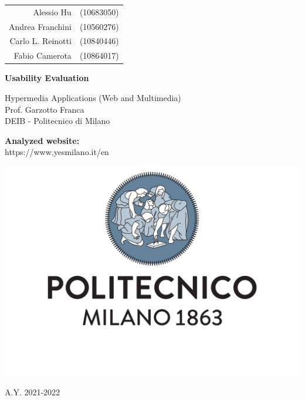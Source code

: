 \documentclass[a4paper, 11pt]{article}
\begin{document}
\begin{titlepage}
	\centering
    \begin{tabular}{rl}
        Alessio Hu & (10683050) \\
        Andrea Franchini & (10560276) \\ 
        Carlo L. Reinotti & (10840446) \\
        Fabio Camerota & (10864017) \\
    \end{tabular}

    \vspace{1.5cm}
    {\Huge \textbf{Usability Evaluation\\}}
    \vspace{1.5cm}
    {\large 
        Hypermedia Applications (Web and Multimedia) \\
        Prof. Garzotto Franca \\ 
		DEIB - Politecnico di Milano \par
    }
    \vspace{1.5cm}
    {\large \textbf{Analyzed website:}\\
    \vspace{0.5cm}
    https://www.yesmilano.it/en}
    \par
    \vspace{3cm}
    \includegraphics[scale=0.4]{images/logo.pdf}
    \par
    \vspace{3cm}
	A.Y. 2021-2022
    
	
\end{titlepage}

\tableofcontents
    
    
    
    
    \pagebreak
    
    \pagebreak
    
\end{document}
